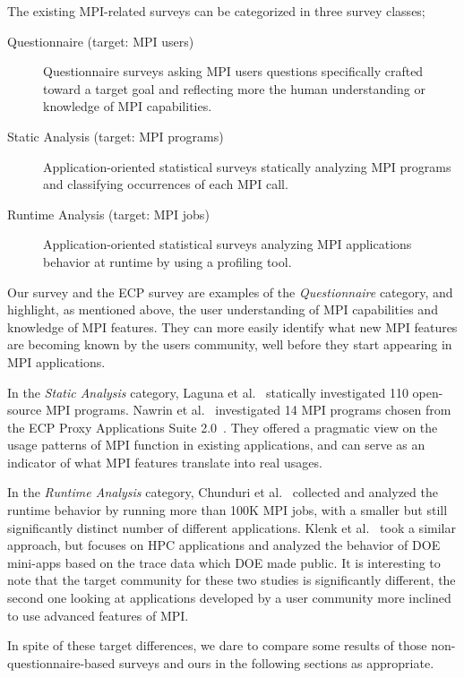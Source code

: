 \documentclass[preprint,5p,times]{elsarticle}
\begin{document}
{
The existing MPI-related surveys can be categorized in three survey classes;
%
\begin{description}
\item[Questionnaire (target: MPI users)] Questionnaire surveys asking MPI
  users questions specifically crafted toward a target goal and
  reflecting more the human understanding or knowledge of MPI
  capabilities. 
  \item[Static Analysis (target: MPI programs)] Application-oriented statistical surveys
    statically analyzing MPI programs and classifying occurrences of
    each MPI call. 
  \item[Runtime Analysis (target: MPI jobs)] Application-oriented statistical surveys
    analyzing MPI applications behavior at runtime by using a
    profiling tool. 
\end{description}

Our survey and the ECP survey are examples of the {\it Questionnaire} category,
and highlight, as mentioned above, the user understanding of MPI
capabilities and knowledge of MPI features. They can more easily
identify what new MPI features are becoming known by the users
community, well before they start appearing in MPI applications. 

In the {\it Static Analysis} category, Laguna et
al.~\cite{10.1145/3295500.3356176} statically investigated 
110 open-source MPI programs. Nawrin et al.~\cite{cpe-5901}
investigated 14 MPI programs chosen from the ECP Proxy Applications Suite
2.0~\cite{osti-1482870}. They offered a pragmatic view on the usage patterns of
MPI function in existing applications, and can serve as an indicator of what MPI
features translate into real usages.

In the {\it Runtime Analysis} category, Chunduri et al.~\cite{8665758}
collected and analyzed the runtime behavior by running more than 100K
MPI jobs, with a smaller but still significantly distinct number of
different applications. Klenk et
al.~\cite{10.1007/978-3-319-58667-0-12} took a similar approach, but 
focuses on HPC applications and analyzed the behavior of DOE 
mini-apps based on the trace data which DOE made public. It is
interesting to note that the target community for these
two studies is significantly different, the second one
looking at applications developed by a user community more inclined to
use advanced features of MPI. 

In spite of these target differences, we dare to compare some results
of those non-questionnaire-based surveys and ours in the
following sections as appropriate.}
\end{document}
